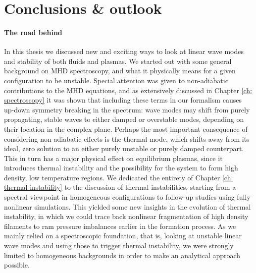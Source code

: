 \chapter{Conclusions \& outlook} \label{ch: conclusions}

\subsubsection{The road behind}
In this thesis we discussed new and exciting ways to look at linear wave modes and stability of both fluids and plasmas.
We started out with some general background on MHD spectroscopy, and what it physically means for a given configuration to be unstable. Special attention was given to non-adiabatic contributions to the MHD equations, and as extensively discussed in Chapter \ref{ch: spectroscopy} it was shown that including these terms in our formalism causes up-down symmetry breaking in the spectrum: wave modes may shift from purely propagating, stable waves to either damped or overstable modes, depending on their location in the complex plane. Perhaps the most important consequence of considering non-adiabatic effects is the thermal mode, which shifts away from its ideal, zero solution to an either purely unstable or purely damped counterpart. This in turn has a major physical effect on equilibrium plasmas, since it introduces thermal instability and the possibility for the system to form high density, low temperature regions. We dedicated the entirety of Chapter \ref{ch: thermal instability} to the discussion of thermal instabilities, starting from a spectral viewpoint in homogeneous configurations to follow-up studies using fully nonlinear simulations. This yielded some new insights in the evolution of thermal instability, in which we could trace back nonlinear fragmentation of high density filaments to ram pressure imbalances earlier in the formation process. As we mainly relied on a spectroscopic foundation, that is, looking at unstable linear wave modes and using those to trigger thermal instability, we were strongly limited to homogeneous backgrounds in order to make an analytical approach possible.

